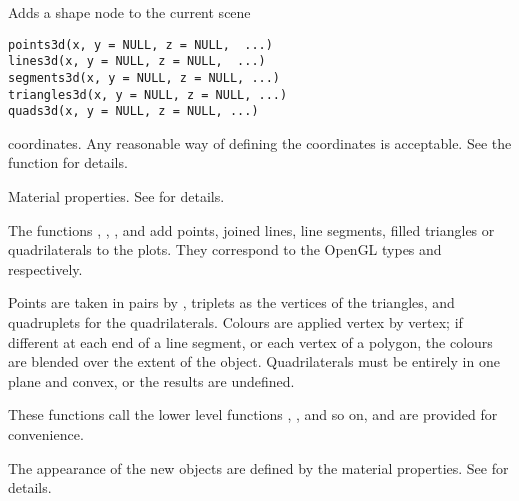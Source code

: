 \begin{Description}\relax
Adds a shape node to the current scene
\end{Description}
\begin{Usage}
\begin{verbatim}
points3d(x, y = NULL, z = NULL,  ...)
lines3d(x, y = NULL, z = NULL,  ...)
segments3d(x, y = NULL, z = NULL, ...)
triangles3d(x, y = NULL, z = NULL, ...)
quads3d(x, y = NULL, z = NULL, ...)
\end{verbatim}
\end{Usage}
\begin{Arguments}
\begin{ldescription}
\item[\code{x, y, z}] coordinates. Any reasonable way of defining the
coordinates is acceptable.  See the function 
for details.
\item[\code{ ... }] Material properties. See  for details.
\end{ldescription}
\end{Arguments}
\begin{Details}\relax
The functions , , ,
 and  add points, joined lines, line segments,
filled triangles or quadrilaterals to the plots.  They correspond to the OpenGL types
 and  respectively.  

Points are taken in pairs by , triplets as the vertices
of the triangles, and quadruplets for the quadrilaterals.  Colours are applied vertex by vertex; 
if different at each end of a line segment, or each vertex of a polygon, the colours
are blended over the extent of the object.  Quadrilaterals must be entirely 
in one plane and convex, or the results are undefined.

These functions call the lower level functions , ,
and so on, and are provided for convenience.

The appearance of the new objects are defined by the material properties.
See  for details.
\end{Details}
